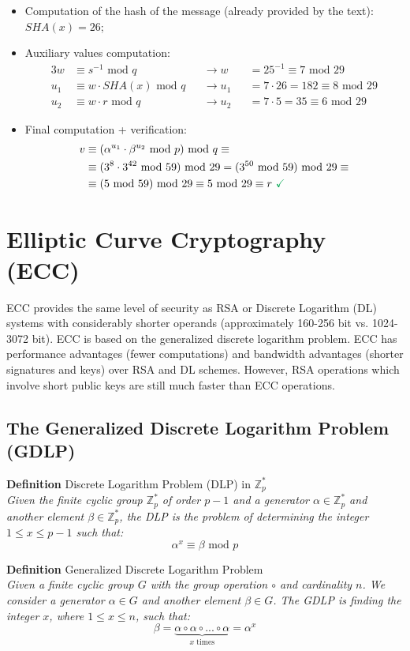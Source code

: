 \documentclass[11pt, a4paper]{article}
\newcommand{\mymod}{
    \text{ mod }
}
\begin{document}
\begin{itemize}
    \item Computation of the hash of the message (already provided by the text): $SHA(x)=26$;
    \item Auxiliary values computation:
    \begin{alignat*}{3}
        w&\equiv s^{-1}\mymod q&&\longrightarrow w&&=25^{-1}\equiv7\mymod29\\
        u_1&\equiv w\cdot SHA(x)\mymod q&&\longrightarrow u_1&&=7\cdot26=182\equiv8\mymod29\\
        u_2&\equiv w\cdot r\mymod q&&\longrightarrow u_2&&=7\cdot5=35\equiv6\mymod29
    \end{alignat*}
    \item Final computation + verification:
    \begin{align*}
        v&\equiv(\alpha^{u_1}\cdot\beta^{u_2}\mymod p)\mymod q\equiv\\
        &\equiv(3^8\cdot3^{42}\mymod 59)\mymod29=(3^{50}\mymod59)\mymod29\equiv\\
        &\equiv (5\mymod59)\mymod29\equiv5\mymod29\equiv r\text{ \textcolor{Green}\checkmark}
    \end{align*}
\end{itemize}

\newpage
\section{Elliptic Curve Cryptography (ECC)}
ECC provides the same level of security as RSA or Discrete Logarithm (DL) systems with considerably shorter operands (approximately 160-256 bit vs. 1024-3072 bit). ECC is based on the generalized discrete logarithm problem. ECC has performance advantages (fewer computations) and bandwidth advantages (shorter signatures and keys) over RSA and DL schemes. However, RSA operations which involve short public keys are still much faster than ECC operations.

\subsection{The Generalized Discrete Logarithm Problem (GDLP)}
\begin{framed}
    \hfill\break\textbf{Definition} Discrete Logarithm Problem (DLP) in $\mathbb{Z}_p^*$\\
    \textit{Given the finite cyclic group $\mathbb{Z}_p^*$ of order $p-1$ and a generator $\alpha\in\mathbb{Z}_p^*$ and another element $\beta\in\mathbb{Z}_p^*$, the DLP is the problem of determining the integer $1\le x\le p-1$ such that:}
    $$\alpha^x\equiv \beta\mymod p$$
\end{framed}
\begin{framed}
    \hfill\break\textbf{Definition} Generalized Discrete Logarithm Problem\\
    \textit{Given a finite cyclic group $G$ with the group operation $\circ$ and cardinality $n$. We consider a generator $\alpha\in G$ and another element $\beta\in G$. The GDLP is finding the integer $x$, where $1\le x\le n$, such that:}
    $$\beta=\underbrace{\alpha\circ\alpha\circ...\circ\alpha}_{x\text{ times}}=\alpha^x$$
\end{framed}
\end{document}
